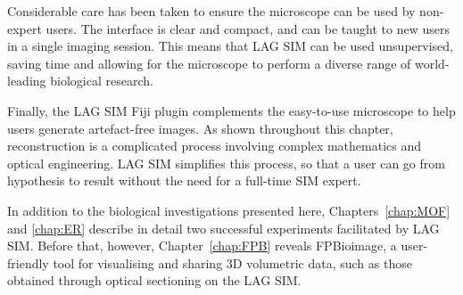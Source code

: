 Considerable care has been taken to ensure the microscope can be used by non-expert users. 
The interface is clear and compact, and can be taught to new users in a single imaging session. 
This means that LAG SIM can be used unsupervised, saving time and allowing for the microscope to perform a diverse range of world-leading biological research.

Finally, the LAG SIM Fiji plugin complements the easy-to-use microscope to help users generate artefact-free images. 
As shown throughout this chapter, reconstruction is a complicated process involving complex mathematics and optical engineering. 
LAG SIM simplifies this process, so that a user can go from hypothesis to result without the need for a full-time SIM expert. 

In addition to the biological investigations presented here, Chapters~\ref{chap:MOF} and \ref{chap:ER} describe in detail two successful experiments facilitated by LAG SIM. 
Before that, however, Chapter~\ref{chap:FPB} reveals FPBioimage, a user-friendly tool for visualising and sharing 3D volumetric data, such as those obtained through optical sectioning on the LAG SIM. 